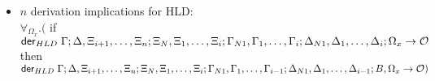 \begin{theorem}
\begin{itemize}[leftmargin=*]
\begin{itemize}[leftmargin=\secondm]
      \item $n$ derivation implications for HLD: \\
      $\forall_{\Omega_x}.($ if $\mathsf{der}_{HLD} \; \Gamma; \Delta, \Xi_{i+1}, \dotsc, \Xi_{n}; \Xi_N, \Xi_1,
            \dotsc, \Xi_i; \Gamma_{N1}, \Gamma_1, \dotsc, \Gamma_i; \Delta_{N1},
            \Delta_1, \dotsc, \Delta_i; \Omega_x \rightarrow \mathcal{O}$ then $\mathsf{der}_{HLD} \; \Gamma; \Delta, \Xi_{i+1}, \dotsc, \Xi_{n}; \Xi_N, \Xi_1,
            \dotsc,
            \Xi_i; \Gamma_{N1}, \Gamma_1, \dotsc, \Gamma_{i-1}; \Delta_{N1},
            \Delta_1, \dotsc, \Delta_{i-1}; B, \Omega_x \rightarrow \mathcal{O})$
   \end{itemize}

\end{itemize}
   
\end{theorem}
